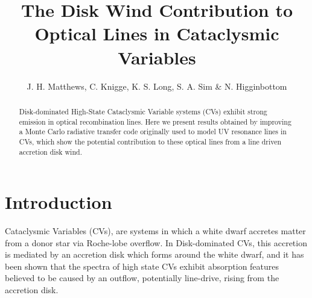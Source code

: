 \documentclass[usenatbib, a4paper]{mn2e}
\begin{document}

\renewcommand{\labelitemi}{$-$}
\def\la{Ly-$\alpha$ }
\def\py{\textsc{Python} }
\def\civ{C~\textsc{iv} }
\def\araa{ARAA}
\def\nat{Nature}
\def\apjl{ApJ Letters}
\def\aapr{AAPR}
\def\ssr{SSR}
\def\apj{ApJ}
\def\pasp{PASP}
\def\aap{A\&A}
\def\mnras{MNRAS}
\def\aj{AJ}
\def\rmxaa{RMXAA}

%
%


\title{The Disk Wind Contribution to Optical Lines in Cataclysmic Variables}
\author{J. H.
  Matthews, C. Knigge, K. S. Long, S. A. Sim \& N. Higginbottom}


%
%
\maketitle





\begin{abstract}
Disk-dominated High-State Cataclysmic Variable systems (CVs) exhibit strong emission in optical recombination lines.
Here we present results obtained by improving a Monte Carlo radiative transfer code originally used
to model UV resonance lines in CVs, which show the potential contribution to these optical lines
from a line driven accretion disk wind.
\end{abstract}


%
%

\section{Introduction} 

Cataclysmic Variables (CVs), are systems in which a white dwarf accretes matter from a donor star
via Roche-lobe overflow. In Disk-dominated CVs, this accretion is mediated by an accretion disk which forms 
around the white dwarf, and it has been shown that the spectra of high state CVs
exhibit absorption features believed to be caused by an outflow, potentially line-drive,
rising from the accretion disk. 
\end{document}
